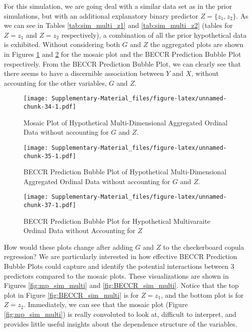 \documentclass[
]{article}
\begin{document}
For this simulation, we are going deal with a similar data set as in the
prior simulations, but with an additional explanatory binary predictor
\(Z = \{z_1,z_2\}\). As we can see in Tables \ref{tab:sim_multi_z1} and
\ref{tab:sim_multi_z2} (tables for \(Z=z_1\) and \(Z=z_2\)
respectively), a combination of all the prior hypothetical data is
exhibited. Without considering both \(G\) and \(Z\) the aggregated plots
are shown in Figures \ref{fig:mp_sim_multi_ungroup} and
\ref{fig:BECCR_sim_multi_ungroup} for the mosaic plot and the BECCR
Prediction Bubble Plot respectively. From the BECCR Prediction Bubble
Plot, we can clearly see that there seems to have a discernible
association between \(Y\) and \(X\), without accounting for the other
variables, \(G\) and \(Z\).

\begin{figure}
\centering
\texttt{[image: Supplementary-Material\_files/figure-latex/unnamed-chunk-34-1.pdf]}
\caption{\label{fig:mp_sim_multi_ungroup}Mosaic Plot of Hypothetical
Multi-Dimensional Aggregated Ordinal Data without accounting for \(G\)
and \(Z\).}
\end{figure}

\begin{figure}
\centering
\texttt{[image: Supplementary-Material\_files/figure-latex/unnamed-chunk-35-1.pdf]}
\caption{\label{fig:BECCR_sim_multi_ungroup}BECCR Prediction Bubble Plot
of Hypothetical Multi-Dimensional Aggregated Ordinal Data without
accounting for \(G\) and \(Z\).}
\end{figure}

\begin{figure}
\centering
\texttt{[image: Supplementary-Material\_files/figure-latex/unnamed-chunk-37-1.pdf]}
\caption{\label{fig:BECCR_sim_multi_noz}BECCR Prediction Bubble Plot for
Hypothetical Multivaraite Ordinal Data without Accounting for \(Z\)}
\end{figure}

How would these plots change after adding \(G\) and \(Z\) to the
checkerboard copula regression? We are particularly interested in how
effective BECCR Prediction Bubble Plots could capture and identify the
potential interactions between 3 predictors compared to the mosaic
plots. These visualizations are shown in Figures \ref{fig:mp_sim_multi}
and \ref{fig:BECCR_sim_multi}. Notice that the top plot in Figure
\ref{fig:BECCR_sim_multi} is for \(Z=z_1\), and the bottom plot is for
\(Z=z_2\). Immediately, we can see that the mosaic plot (Figure
\ref{fig:mp_sim_multi}) is really convoluted to look at, difficult to
interpret, and provides little useful insights about the dependence
structure of the variables.
\end{document}
